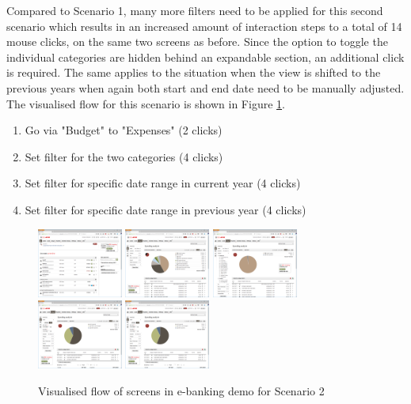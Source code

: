 Compared to Scenario 1, many more filters need to be applied for this second scenario which results in an increased amount of interaction steps to a total of 14 mouse clicks, on the same two screens as before. Since the option to toggle the individual categories are hidden behind an expandable section, an additional click is required. The same applies to the situation when the view is shifted to the previous years when again both start and end date need to be manually adjusted. The visualised flow for this scenario is shown in Figure \ref{fig:scenariotwoebanking}.
\begin{enumerate}
	\item Go via "Budget" to "Expenses" (2 clicks)
	\item Set filter for the two categories (4 clicks)
	\item Set filter for specific date range in current year (4 clicks)
	\item Set filter for specific date range in previous year (4 clicks)
\end{enumerate}
\begin{figure}[h]
	\begin{center}
		\includegraphics[width=2.8cm]{03_Figures/09_Evaluation/UBS_1_Overview.png}
		\includegraphics[width=2.8cm]{03_Figures/09_Evaluation/UBS_2_SpendingAnalysis.png}
		\includegraphics[width=2.8cm]{03_Figures/09_Evaluation/UBS_2_SpendingAnalysis_FilterCat.png}
		\includegraphics[width=2.8cm]{03_Figures/09_Evaluation/UBS_2_SpendingAnalysis_Filter.png}
		\includegraphics[width=2.8cm]{03_Figures/09_Evaluation/UBS_2_SpendingAnalysis_Filter.png}
		\caption{Visualised flow of screens in e-banking demo for Scenario 2}
		\label{fig:scenariotwoebanking}
	\end{center}
\end{figure}


